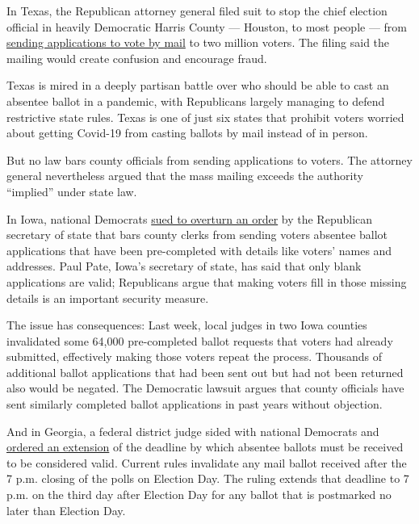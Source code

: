 In Texas, the Republican attorney general filed suit to stop the chief
election official in heavily Democratic Harris County --- Houston, to
most people --- from
\href{https://www.texasattorneygeneral.gov/sites/default/files/images/admin/2020/Press/Original\%20Petition.pdf?utm_content=\&utm_medium=email\&utm_name=\&utm_source=govdelivery\&utm_term=}{sending
applications to vote by mail} to two million voters. The filing said the
mailing would create confusion and encourage fraud.

Texas is mired in a deeply partisan battle over who should be able to
cast an absentee ballot in a pandemic, with Republicans largely managing
to defend restrictive state rules. Texas is one of just six states that
prohibit voters worried about getting Covid-19 from casting ballots by
mail instead of in person.

But no law bars county officials from sending applications to voters.
The attorney general nevertheless argued that the mass mailing exceeds
the authority ``implied'' under state law.

In Iowa, national Democrats
\href{https://www.democracydocket.com/cases/iowa-county-absentee-ballot-requests/}{sued
to overturn an order} by the Republican secretary of state that bars
county clerks from sending voters absentee ballot applications that have
been pre-completed with details like voters' names and addresses. Paul
Pate, Iowa's secretary of state, has said that only blank applications
are valid; Republicans argue that making voters fill in those missing
details is an important security measure.

The issue has consequences: Last week, local judges in two Iowa counties
invalidated some 64,000 pre-completed ballot requests that voters had
already submitted, effectively making those voters repeat the process.
Thousands of additional ballot applications that had been sent out but
had not been returned also would be negated. The Democratic lawsuit
argues that county officials have sent similarly completed ballot
applications in past years without objection.

And in Georgia, a federal district judge sided with national Democrats
and
\href{https://www.democracydocket.com/wp-content/uploads/sites/45/2020/07/PI-Order-GA-4-Pillars.pdf}{ordered
an extension} of the deadline by which absentee ballots must be received
to be considered valid. Current rules invalidate any mail ballot
received after the 7 p.m. closing of the polls on Election Day. The
ruling extends that deadline to 7 p.m. on the third day after Election
Day for any ballot that is postmarked no later than Election Day.

